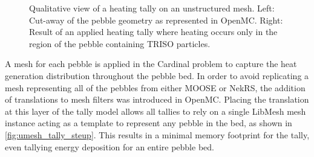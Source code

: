 \begin{figure}
    \centering
    \hspace*{.2in}
    \caption{Qualitative view of a heating tally on an unstructured mesh. Left: Cut-away of the pebble geometry as represented in OpenMC. Right: Result of an applied heating tally where heating occurs only in the region of the pebble containing TRISO particles.}
    \label{fig:pebble_umesh}
\end{figure}

A mesh for each pebble is applied in the Cardinal problem to capture the heat generation distribution throughout the pebble bed. In order to avoid replicating a mesh representing all of the pebbles from either MOOSE or NekRS, the addition of translations to mesh filters was introduced in OpenMC. Placing the translation at this layer of the tally model allows all tallies to rely on a single LibMesh mesh instance acting as a template to represent any pebble in the bed, as shown in \autoref{fig:umesh_tally_steup}. This results in a minimal memory footprint for the tally, even tallying energy deposition for an entire pebble bed.

